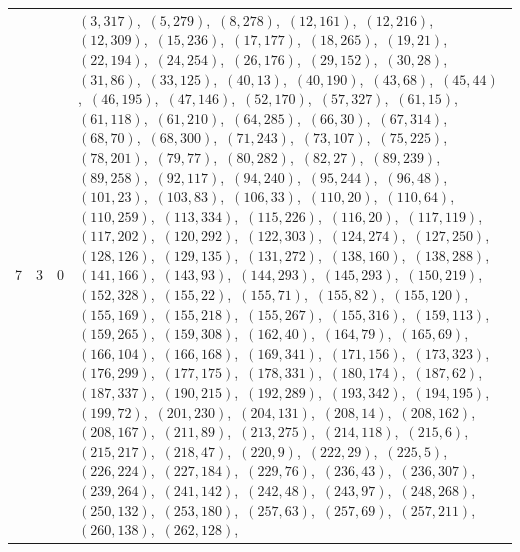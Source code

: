 \documentclass[11pt]{article}
\begin{document}
\begin{longtable}{@{}rrl>{\raggedright\arraybackslash}p{}@{}}
7 & 3 & $0$ & $(3,317)$,\allowbreak\ $(5,279)$,\allowbreak\ $(8,278)$,\allowbreak\ $(12,161)$,\allowbreak\ $(12,216)$,\allowbreak\ $(12,309)$,\allowbreak\ $(15,236)$,\allowbreak\ $(17,177)$,\allowbreak\ $(18,265)$,\allowbreak\ $(19,21)$,\allowbreak\ $(22,194)$,\allowbreak\ $(24,254)$,\allowbreak\ $(26,176)$,\allowbreak\ $(29,152)$,\allowbreak\ $(30,28)$,\allowbreak\ $(31,86)$,\allowbreak\ $(33,125)$,\allowbreak\ $(40,13)$,\allowbreak\ $(40,190)$,\allowbreak\ $(43,68)$,\allowbreak\ $(45,44)$,\allowbreak\ $(46,195)$,\allowbreak\ $(47,146)$,\allowbreak\ $(52,170)$,\allowbreak\ $(57,327)$,\allowbreak\ $(61,15)$,\allowbreak\ $(61,118)$,\allowbreak\ $(61,210)$,\allowbreak\ $(64,285)$,\allowbreak\ $(66,30)$,\allowbreak\ $(67,314)$,\allowbreak\ $(68,70)$,\allowbreak\ $(68,300)$,\allowbreak\ $(71,243)$,\allowbreak\ $(73,107)$,\allowbreak\ $(75,225)$,\allowbreak\ $(78,201)$,\allowbreak\ $(79,77)$,\allowbreak\ $(80,282)$,\allowbreak\ $(82,27)$,\allowbreak\ $(89,239)$,\allowbreak\ $(89,258)$,\allowbreak\ $(92,117)$,\allowbreak\ $(94,240)$,\allowbreak\ $(95,244)$,\allowbreak\ $(96,48)$,\allowbreak\ $(101,23)$,\allowbreak\ $(103,83)$,\allowbreak\ $(106,33)$,\allowbreak\ $(110,20)$,\allowbreak\ $(110,64)$,\allowbreak\ $(110,259)$,\allowbreak\ $(113,334)$,\allowbreak\ $(115,226)$,\allowbreak\ $(116,20)$,\allowbreak\ $(117,119)$,\allowbreak\ $(117,202)$,\allowbreak\ $(120,292)$,\allowbreak\ $(122,303)$,\allowbreak\ $(124,274)$,\allowbreak\ $(127,250)$,\allowbreak\ $(128,126)$,\allowbreak\ $(129,135)$,\allowbreak\ $(131,272)$,\allowbreak\ $(138,160)$,\allowbreak\ $(138,288)$,\allowbreak\ $(141,166)$,\allowbreak\ $(143,93)$,\allowbreak\ $(144,293)$,\allowbreak\ $(145,293)$,\allowbreak\ $(150,219)$,\allowbreak\ $(152,328)$,\allowbreak\ $(155,22)$,\allowbreak\ $(155,71)$,\allowbreak\ $(155,82)$,\allowbreak\ $(155,120)$,\allowbreak\ $(155,169)$,\allowbreak\ $(155,218)$,\allowbreak\ $(155,267)$,\allowbreak\ $(155,316)$,\allowbreak\ $(159,113)$,\allowbreak\ $(159,265)$,\allowbreak\ $(159,308)$,\allowbreak\ $(162,40)$,\allowbreak\ $(164,79)$,\allowbreak\ $(165,69)$,\allowbreak\ $(166,104)$,\allowbreak\ $(166,168)$,\allowbreak\ $(169,341)$,\allowbreak\ $(171,156)$,\allowbreak\ $(173,323)$,\allowbreak\ $(176,299)$,\allowbreak\ $(177,175)$,\allowbreak\ $(178,331)$,\allowbreak\ $(180,174)$,\allowbreak\ $(187,62)$,\allowbreak\ $(187,337)$,\allowbreak\ $(190,215)$,\allowbreak\ $(192,289)$,\allowbreak\ $(193,342)$,\allowbreak\ $(194,195)$,\allowbreak\ $(199,72)$,\allowbreak\ $(201,230)$,\allowbreak\ $(204,131)$,\allowbreak\ $(208,14)$,\allowbreak\ $(208,162)$,\allowbreak\ $(208,167)$,\allowbreak\ $(211,89)$,\allowbreak\ $(213,275)$,\allowbreak\ $(214,118)$,\allowbreak\ $(215,6)$,\allowbreak\ $(215,217)$,\allowbreak\ $(218,47)$,\allowbreak\ $(220,9)$,\allowbreak\ $(222,29)$,\allowbreak\ $(225,5)$,\allowbreak\ $(226,224)$,\allowbreak\ $(227,184)$,\allowbreak\ $(229,76)$,\allowbreak\ $(236,43)$,\allowbreak\ $(236,307)$,\allowbreak\ $(239,264)$,\allowbreak\ $(241,142)$,\allowbreak\ $(242,48)$,\allowbreak\ $(243,97)$,\allowbreak\ $(248,268)$,\allowbreak\ $(250,132)$,\allowbreak\ $(253,180)$,\allowbreak\ $(257,63)$,\allowbreak\ $(257,69)$,\allowbreak\ $(257,211)$,\allowbreak\ $(260,138)$,\allowbreak\ $(262,128)$,\allowbreak\ 
\end{longtable}
\end{document}
